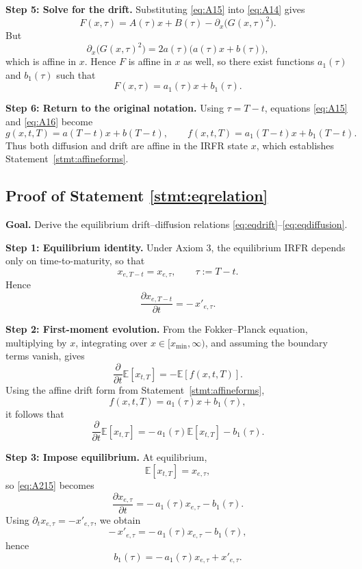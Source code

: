 \documentclass[12pt]{article}
\theoremstyle{statementstyle}
\begin{document}
\begin{appendices}
\medskip
\noindent\textbf{Step 5: Solve for the drift.}  
Substituting \eqref{eq:A15} into \eqref{eq:A14} gives
\[
F(x,\tau)
=
A(\tau)x+B(\tau)-\partial_x\!\bigl(G(x,\tau)^2\bigr).
\]
But
\[
\partial_x\!\bigl(G(x,\tau)^2\bigr)
=
2a(\tau)\bigl(a(\tau)x+b(\tau)\bigr),
\]
which is affine in \(x\). Hence \(F\) is affine in \(x\) as well, so there
exist functions \(a_1(\tau)\) and \(b_1(\tau)\) such that
\begin{equation}
F(x,\tau)=a_1(\tau)x+b_1(\tau).
\tag{A.1.6}\label{eq:A16}
\end{equation}

\medskip
\noindent\textbf{Step 6: Return to the original notation.}  
Using \(\tau=T-t\), equations \eqref{eq:A15} and \eqref{eq:A16} become
\[
g(x,t,T)=a(T-t)x+b(T-t),
\qquad
f(x,t,T)=a_1(T-t)x+b_1(T-t).
\]
Thus both diffusion and drift are affine in the IRFR state \(x\), which
establishes Statement~\ref{stmt:affineforms}.
\subsection{Proof of Statement \ref{stmt:eqrelation}}
\label{appendix:A2}

\textbf{Goal.}  
Derive the equilibrium drift--diffusion relations
\eqref{eq:eqdrift}--\eqref{eq:eqdiffusion}.

\medskip
\noindent\textbf{Step 1: Equilibrium identity.}  
Under Axiom 3, the equilibrium IRFR depends only on time-to-maturity, so that
\[
x_{e,T-t}=x_{e,\tau}, \qquad \tau:=T-t.
\]
Hence
\[
\frac{\partial x_{e,T-t}}{\partial t}
=
-\,x'_{e,\tau}.
\tag{A.2.12}
\]

\medskip
\noindent\textbf{Step 2: First-moment evolution.}  
From the Fokker--Planck equation, multiplying by \(x\), integrating over
\(x\in[x_{\min},\infty)\), and assuming the boundary terms vanish, gives
\[
\frac{\partial}{\partial t}\mathbb{E}[x_{t,T}]
=
-\mathbb{E}[f(x,t,T)].
\tag{A.2.13}
\]
Using the affine drift form from Statement~\ref{stmt:affineforms},
\[
f(x,t,T)=a_1(\tau)x+b_1(\tau),
\tag{A.2.14}\label{eq:A214}
\]
it follows that
\[
\frac{\partial}{\partial t}\mathbb{E}[x_{t,T}]
=
-\,a_1(\tau)\mathbb{E}[x_{t,T}] - b_1(\tau).
\tag{A.2.15}\label{eq:A215}
\]

\medskip
\noindent\textbf{Step 3: Impose equilibrium.}  
At equilibrium,
\[
\mathbb{E}[x_{t,T}]=x_{e,\tau},
\]
so \eqref{eq:A215} becomes
\[
\frac{\partial x_{e,\tau}}{\partial t}
=
-\,a_1(\tau)x_{e,\tau}-b_1(\tau).
\tag{A.2.16}
\]
Using \(\partial_t x_{e,\tau}=-x'_{e,\tau}\), we obtain
\[
-\,x'_{e,\tau}
=
-\,a_1(\tau)x_{e,\tau}-b_1(\tau),
\]
hence
\[
b_1(\tau)
=
-\,a_1(\tau)x_{e,\tau}+x'_{e,\tau}.
\tag{A.2.17}\label{eq:A217}
\]


\end{appendices}
\end{document}
